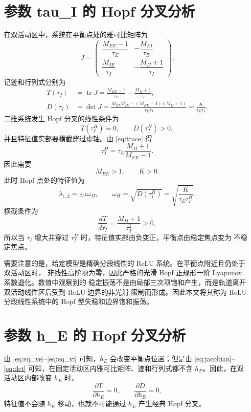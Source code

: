 \documentclass[UTF8]{ctexart}
\begin{document}
\section{参数 tau\_I 的 Hopf 分叉分析}

在双活动区中，系统在平衡点处的雅可比矩阵为
\begin{equation}
J=
\begin{pmatrix}
\dfrac{M_{EE}-1}{\tau_E} & -\dfrac{M_{EI}}{\tau_E}\\[8pt]
\dfrac{M_{IE}}{\tau_I} & -\dfrac{M_{II}+1}{\tau_I}
\end{pmatrix}.
\label{eq:jacobian}
\end{equation}
记迹和行列式分别为
\begin{align}
T(\tau_I)
&=\operatorname{tr}J
=\frac{M_{EE}-1}{\tau_E}-\frac{M_{II}+1}{\tau_I},
\label{eq:trace}\\
D(\tau_I)
&=\det J
=\frac{M_{EI}M_{IE}-(M_{EE}-1)(M_{II}+1)}
{\tau_E\tau_I}
=\frac{K}{\tau_E\tau_I}.
\label{eq:det}
\end{align}
二维系统发生 Hopf 分叉的线性条件为
\[
T(\tau_I^H)=0,\qquad D(\tau_I^H)>0,
\]
并且特征值实部要横截穿过虚轴。由 \eqref{eq:trace} 得
\begin{equation}
\tau_I^H
=\tau_E\frac{M_{II}+1}{M_{EE}-1}.
\label{eq:tau_hopf}
\end{equation}
因此需要
\[
M_{EE}>1,\qquad K>0.
\]
此时 Hopf 点处的特征值为
\[
\lambda_{1,2}=\pm i\omega_H,\qquad
\omega_H=\sqrt{D(\tau_I^H)}
=\sqrt{\frac{K}{\tau_E\tau_I^H}}.
\]
横截条件为
\[
\frac{dT}{d\tau_I}
=\frac{M_{II}+1}{\tau_I^2}>0,
\]
所以当 $\tau_I$ 增大并穿过 $\tau_I^H$ 时，特征值实部由负变正，平衡点由稳定焦点变为
不稳定焦点。

需要注意的是，给定模型是精确分段线性的 ReLU 系统。在平衡点附近且仍处于双活动区时，
非线性高阶项为零，因此严格的光滑 Hopf 正规形一阶 Lyapunov 系数退化。数值中观察到的
稳定振荡不是由局部三次项饱和产生，而是轨道离开双活动线性区后受到 ReLU 边界的非光滑
限制而形成。因此本文将其称为 ReLU 分段线性系统中的 Hopf 型失稳和边界饱和振荡。

\section{参数 h\_E 的 Hopf 分叉分析}

由 \eqref{eq:eq_ve}--\eqref{eq:eq_vi} 可知，$h_E$ 会改变平衡点位置；但是由
\eqref{eq:jacobian}--\eqref{eq:det} 可知，在固定活动区内雅可比矩阵、迹和行列式都不含
$h_E$。因此，在双活动区内部改变 $h_E$ 时，
\[
\frac{\partial T}{\partial h_E}=0,\qquad
\frac{\partial D}{\partial h_E}=0,
\]
特征值不会随 $h_E$ 移动，也就不可能通过 $h_E$ 产生经典 Hopf 分叉。
\end{document}
